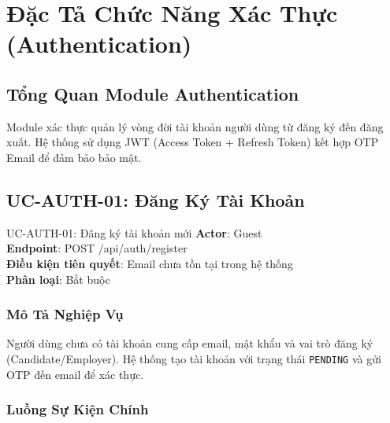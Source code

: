 \documentclass[12pt, a4paper]{report}
\begin{document}
\chapter{Đặc Tả Chức Năng Xác Thực (Authentication)}

\section{Tổng Quan Module Authentication}

Module xác thực quản lý vòng đời tài khoản người dùng từ đăng ký đến đăng xuất. Hệ thống sử dụng JWT (Access Token + Refresh Token) kết hợp OTP Email để đảm bảo bảo mật.

\section{UC-AUTH-01: Đăng Ký Tài Khoản}

\begin{requirementbox}{UC-AUTH-01: Đăng ký tài khoản mới}
\textbf{Actor}: Guest \\
\textbf{Endpoint}: POST /api/auth/register \\
\textbf{Điều kiện tiên quyết}: Email chưa tồn tại trong hệ thống \\
\textbf{Phân loại}: Bắt buộc
\end{requirementbox}

\subsection{Mô Tả Nghiệp Vụ}

Người dùng chưa có tài khoản cung cấp email, mật khẩu và vai trò đăng ký (Candidate/Employer). Hệ thống tạo tài khoản với trạng thái \texttt{PENDING} và gửi OTP đến email để xác thực.

\subsection{Luồng Sự Kiện Chính}
\end{document}
